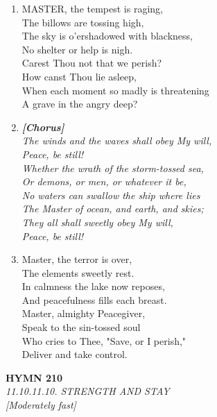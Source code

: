 \documentclass[11pt,a4paper]{article}
\begin{document}
\begin{enumerate}
    \item MASTER, the tempest is raging, \\
            The billows are tossing high, \\
        The sky is o'ershadowed with blackness, \\
            No shelter or help is nigh. \\
        Carest Thou not that we perish? \\
            How canst Thou lie asleep, \\
        When each moment so madly is threatening \\
            A grave in the angry deep?

    \item[] \vspace{0.4em}
    \textbf{\textit{[Chorus]}} \\
    \textit{The winds and the waves shall obey My will,} \\
    \textit{    Peace, be still!} \\
    \textit{Whether the wrath of the storm-tossed sea,} \\
    \textit{Or demons, or men, or whatever it be,} \\
    \textit{No waters can swallow the ship where lies} \\
    \textit{The Master of ocean, and earth, and skies;} \\
    \textit{They all shall sweetly obey My will,} \\
    \textit{    Peace, be still!}
    \vspace{0.4em}

    \item Master, the terror is over, \\
            The elements sweetly rest. \\
        In calmness the lake now reposes, \\
            And peacefulness fills each breast. \\
        Master, almighty Peacegiver, \\
            Speak to the sin-tossed soul \\
        Who cries to Thee, "Save, or I perish," \\
            Deliver and take control.

\end{enumerate}

\newpage
\begin{center}
    {\Large \textbf{HYMN 210}}
    \\
    \textit{11.10.11.10. STRENGTH AND STAY}
    \\
    \textit{\small [Moderately fast]}
\end{center}
\vspace{1em}
\end{document}
